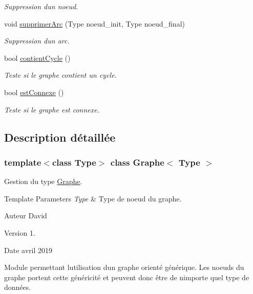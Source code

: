 \begin{DoxyCompactItemize}
\begin{DoxyCompactList}\small\item\em Suppression d\textquotesingle{}un noeud. \end{DoxyCompactList}\item 
void \hyperlink{class_graphe_a4d2b2b022f6c4747f15e1f4e059fef33}{supprimer\+Arc} (Type noeud\+\_\+init, Type noeud\+\_\+final)
\begin{DoxyCompactList}\small\item\em Suppression d\textquotesingle{}un arc. \end{DoxyCompactList}\item 
bool \hyperlink{class_graphe_aa003e00ed2d8c1d49c4b80e3dabfa4fd}{contient\+Cycle} ()
\begin{DoxyCompactList}\small\item\em Teste si le graphe contient un cycle. \end{DoxyCompactList}\item 
bool \hyperlink{class_graphe_a15609b3cd6e0ab6a96afb579ffd420c4}{est\+Connexe} ()
\begin{DoxyCompactList}\small\item\em Teste si le graphe est connexe. \end{DoxyCompactList}\end{DoxyCompactItemize}


\subsection{Description détaillée}
\subsubsection*{template$<$class Type$>$\newline
class Graphe$<$ Type $>$}

Gestion du type \hyperlink{class_graphe}{Graphe}. 


\begin{DoxyTemplParams}{Template Parameters}
{\em Type} & Type de noeud du graphe. \\
\hline
\end{DoxyTemplParams}
\begin{DoxyAuthor}{Auteur}
David 
\end{DoxyAuthor}
\begin{DoxyVersion}{Version}
1. 
\end{DoxyVersion}
\begin{DoxyDate}{Date}
avril 2019
\end{DoxyDate}
Module permettant l\textquotesingle{}utilisation d\textquotesingle{}un graphe orienté générique. Les noeuds du graphe portent cette généricité et peuvent donc être de n\textquotesingle{}importe quel type de données. 


